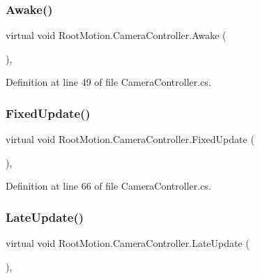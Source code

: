 \subsubsection{\texorpdfstring{Awake()}{Awake()}}
{\footnotesize\ttfamily virtual void Root\+Motion.\+Camera\+Controller.\+Awake (\begin{DoxyParamCaption}{ }\end{DoxyParamCaption})\hspace{0.3cm}{\ttfamily [protected]}, {\ttfamily [virtual]}}



Definition at line 49 of file Camera\+Controller.\+cs.

\mbox{\label{class_root_motion_1_1_camera_controller_ae8784b0a9346a8ef6eeae9f7bfd74bdc}} 
\subsubsection{\texorpdfstring{Fixed\+Update()}{FixedUpdate()}}
{\footnotesize\ttfamily virtual void Root\+Motion.\+Camera\+Controller.\+Fixed\+Update (\begin{DoxyParamCaption}{ }\end{DoxyParamCaption})\hspace{0.3cm}{\ttfamily [protected]}, {\ttfamily [virtual]}}



Definition at line 66 of file Camera\+Controller.\+cs.

\mbox{\label{class_root_motion_1_1_camera_controller_af7f19c87cc315e9d2c617fa87fde08df}} 
\subsubsection{\texorpdfstring{Late\+Update()}{LateUpdate()}}
{\footnotesize\ttfamily virtual void Root\+Motion.\+Camera\+Controller.\+Late\+Update (\begin{DoxyParamCaption}{ }\end{DoxyParamCaption})\hspace{0.3cm}{\ttfamily [protected]}, {\ttfamily [virtual]}}



